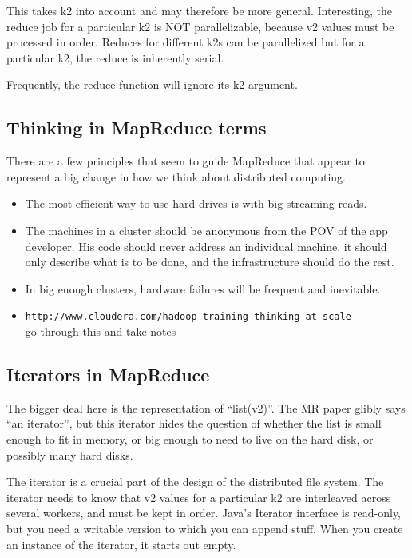 \documentclass[11pt]{article}
\begin{document}
This takes k2 into account and may therefore be more general.
Interesting, the reduce job for a particular k2 is NOT parallelizable,
because v2 values must be processed in order. Reduces for different
k2s can be parallelized but for a particular k2, the reduce is
inherently serial.

Frequently, the reduce function will ignore its k2 argument.

\subsection{Thinking in MapReduce terms}

There are a few principles that seem to guide MapReduce that appear to
represent a big change in how we think about distributed computing.
\begin{itemize}
\item The most efficient way to use hard drives is with big streaming
  reads.
\item The machines in a cluster should be anonymous from the POV of
  the app developer. His code should never address an individual
  machine, it should only describe what is to be done, and the
  infrastructure should do the rest.
\item In big enough clusters, hardware failures will be frequent and
  inevitable.
\item {\tt http://www.cloudera.com/hadoop-training-thinking-at-scale}
  \\ go through this and take notes
\end{itemize}

\subsection{Iterators in MapReduce}

The bigger deal here is the representation of ``list(v2)''. The MR
paper glibly says ``an iterator'', but this iterator
hides the question of whether the list is small enough to fit in
memory, or big enough to need to live on the hard disk, or possibly
many hard disks.

The iterator is a crucial part of the design of the distributed file
system. The iterator needs to know that v2 values for a particular k2
are interleaved across several workers, and must be kept in order.
Java's Iterator interface is read-only, but you need a writable
version to which you can append stuff. When you create an instance of
the iterator, it starts out empty.
\end{document}
